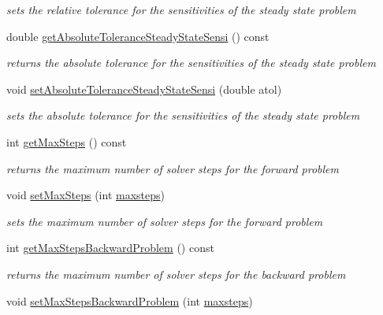 \begin{DoxyCompactItemize}
\begin{DoxyCompactList}\small\item\em sets the relative tolerance for the sensitivities of the steady state problem \end{DoxyCompactList}\item 
double \mbox{\hyperlink{classamici_1_1_solver_ae1b148791e34ba2220eba9c75d21afb0}{get\+Absolute\+Tolerance\+Steady\+State\+Sensi}} () const
\begin{DoxyCompactList}\small\item\em returns the absolute tolerance for the sensitivities of the steady state problem \end{DoxyCompactList}\item 
void \mbox{\hyperlink{classamici_1_1_solver_a7907d753a8151ececcb4f60cb9721064}{set\+Absolute\+Tolerance\+Steady\+State\+Sensi}} (double atol)
\begin{DoxyCompactList}\small\item\em sets the absolute tolerance for the sensitivities of the steady state problem \end{DoxyCompactList}\item 
int \mbox{\hyperlink{classamici_1_1_solver_acf39690ae4c940c7734fc3fadabb4d50}{get\+Max\+Steps}} () const
\begin{DoxyCompactList}\small\item\em returns the maximum number of solver steps for the forward problem \end{DoxyCompactList}\item 
void \mbox{\hyperlink{classamici_1_1_solver_ab321627a9f9d22013638e0eb9b14d2dc}{set\+Max\+Steps}} (int \mbox{\hyperlink{classamici_1_1_solver_a029415ebe024ac6281fd9f190aefb2ee}{maxsteps}})
\begin{DoxyCompactList}\small\item\em sets the maximum number of solver steps for the forward problem \end{DoxyCompactList}\item 
int \mbox{\hyperlink{classamici_1_1_solver_a8f683e8adf7b34cab6dff296b1d38c83}{get\+Max\+Steps\+Backward\+Problem}} () const
\begin{DoxyCompactList}\small\item\em returns the maximum number of solver steps for the backward problem \end{DoxyCompactList}\item 
void \mbox{\hyperlink{classamici_1_1_solver_aa1d39cd744f489c17c3497c98acb7f59}{set\+Max\+Steps\+Backward\+Problem}} (int \mbox{\hyperlink{classamici_1_1_solver_a029415ebe024ac6281fd9f190aefb2ee}{maxsteps}})

\end{DoxyCompactItemize}
